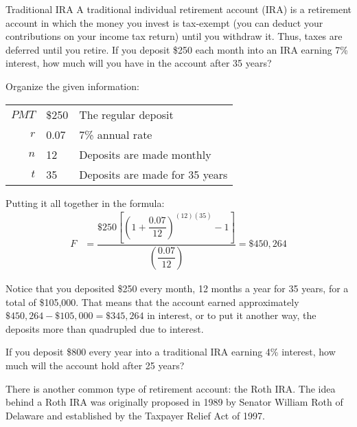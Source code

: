 \begin{example}[https://www.youtube.com/watch?v=X1oXL3ZjcCU]{Traditional IRA}
A traditional individual retirement account (IRA) is a retirement account in which the money you invest is tax-exempt (you can deduct your contributions on your income tax return) until you withdraw it.  Thus, taxes are deferred until you retire.  If you deposit \$250 each month into an IRA earning 7\% interest, how much will you have in the account after 35 years?

\sol
Organize the given information:
\begin{center}
\begin{tabular}{r l l}
$PMT$ & \$250 & The regular deposit\\
$r$ & 0.07 & 7\% annual rate\\
$n$ & 12 & Deposits are made monthly\\
$t$ & 35 & Deposits are made for 35 years
\end{tabular}
\end{center}

Putting it all together in the formula:
\begin{align*}
F &= \dfrac{\$250\left[\left(1+\dfrac{0.07}{12}\right)^{(12)(35)}-1\right]}{\left(\dfrac{0.07}{12}\right)} = \boxed{\$450,264}
\end{align*}

Notice that you deposited \$250 every month, 12 months a year for 35 years, for a total of \$105,000.  That means that the account earned approximately $\$450,264-\$105,000 = \$345,264$ in interest, or to put it another way, the deposits more than quadrupled due to interest.
\end{example}


\begin{try}
If you deposit \$800 every year into a traditional IRA earning 4\% interest, how much will the account hold after 25 years?
\end{try}

There is another common type of retirement account: the Roth IRA.  The idea behind a Roth IRA was originally proposed in 1989 by Senator William Roth of Delaware and established by the Taxpayer Relief Act of 1997.

